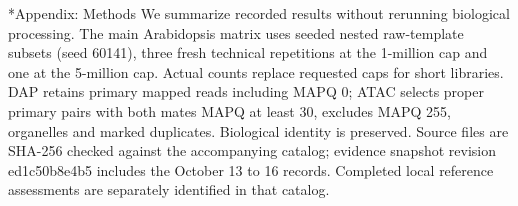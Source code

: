 \documentclass[10pt,letterpaper]{article}
\makeatletter
\renewcommand\section{\@startsection{section}{1}{\z@}{9pt}{4pt}{\large\bfseries}}
\makeatother
\begin{document}
\section*{Appendix: Methods}
We summarize recorded results without rerunning biological processing. The main Arabidopsis matrix uses seeded nested raw-template subsets (seed 60141), three fresh technical repetitions at the 1-million cap and one at the 5-million cap. Actual counts replace requested caps for short libraries. DAP retains primary mapped reads including MAPQ 0; ATAC selects proper primary pairs with both mates MAPQ at least 30, excludes MAPQ 255, organelles and marked duplicates. Biological identity is preserved. Source files are SHA-256 checked against the accompanying catalog; evidence snapshot revision ed1c50b8e4b5 includes the October 13 to 16 records. Completed local reference assessments are separately identified in that catalog.
\end{document}
